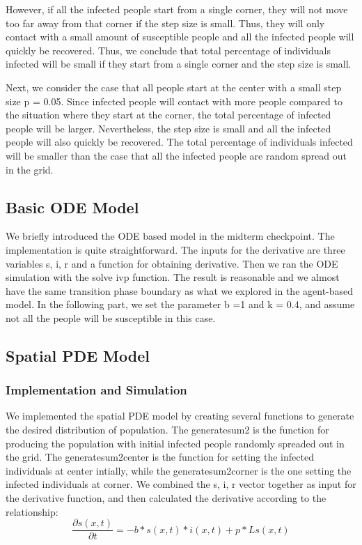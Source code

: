 \documentclass{article}
\begin{document}
However, if all the infected people start from a single corner, they will not move too far away from that corner if the step size is small. Thus, they will only contact with a small amount of susceptible people and all the infected people will quickly be recovered. Thus, we conclude that total percentage of individuals infected will be small if they start from a single corner and the step size is small.


Next, we consider the case that all people start at the center with a small step size p = 0.05. Since infected people will contact with more people compared to the situation where they start at the corner, the total percentage of infected people will be larger. Nevertheless, the step size is small and all the infected people will also quickly be recovered. The total percentage of individuals infected will be smaller than the case that all the infected people are random spread out in the grid. 






\subsection{Basic ODE Model}

We briefly introduced the ODE based model in the midterm checkpoint. The implementation is quite straightforward. The inputs for the derivative are three variables s, i, r and a function for obtaining derivative. Then we ran the ODE simulation with the solve ivp function. The result is reasonable and we almost have the same transition phase boundary as what we explored in the agent-based model. In the following part, we set the parameter b =1 and k = 0.4, and assume not all the people will be susceptible in this case. 



\subsection{Spatial PDE Model}

\subsubsection{Implementation and Simulation}

We implemented the spatial PDE model by creating several functions to generate the desired distribution of population. The generatesum2 is the function for producing the population with initial infected people randomly spreaded out in the grid. The generatesum2center is the function for setting the infected individuals at center intially, while the generatesum2corner is the one setting the infected individuals at corner. We combined the s, i, r vector together as input for the derivative function, and then calculated the derivative according to the relationship: 
$$\frac{\partial s(x,t)}{\partial t} = - b*s(x,t)*i(x,t) + p *L  s(x,t)$$
\end{document}
